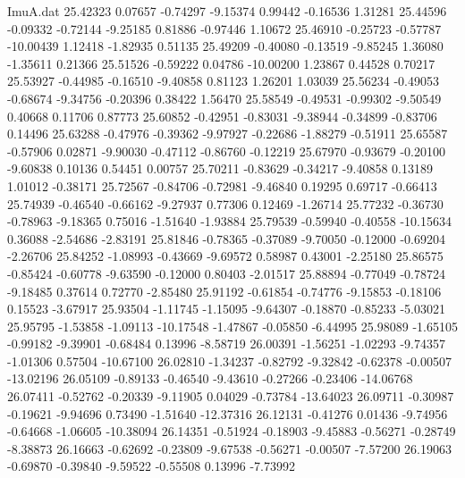 \begin{filecontents}{ImuA.dat}
  25.42323    0.07657   -0.74297   -9.15374    0.99442   -0.16536    1.31281
  25.44596   -0.09332   -0.72144   -9.25185    0.81886   -0.97446    1.10672
  25.46910   -0.25723   -0.57787  -10.00439    1.12418   -1.82935    0.51135
  25.49209   -0.40080   -0.13519   -9.85245    1.36080   -1.35611    0.21366
  25.51526   -0.59222    0.04786  -10.00200    1.23867    0.44528    0.70217
  25.53927   -0.44985   -0.16510   -9.40858    0.81123    1.26201    1.03039
  25.56234   -0.49053   -0.68674   -9.34756   -0.20396    0.38422    1.56470
  25.58549   -0.49531   -0.99302   -9.50549    0.40668    0.11706    0.87773
  25.60852   -0.42951   -0.83031   -9.38944   -0.34899   -0.83706    0.14496
  25.63288   -0.47976   -0.39362   -9.97927   -0.22686   -1.88279   -0.51911
  25.65587   -0.57906    0.02871   -9.90030   -0.47112   -0.86760   -0.12219
  25.67970   -0.93679   -0.20100   -9.60838    0.10136    0.54451    0.00757
  25.70211   -0.83629   -0.34217   -9.40858    0.13189    1.01012   -0.38171
  25.72567   -0.84706   -0.72981   -9.46840    0.19295    0.69717   -0.66413
  25.74939   -0.46540   -0.66162   -9.27937    0.77306    0.12469   -1.26714
  25.77232   -0.36730   -0.78963   -9.18365    0.75016   -1.51640   -1.93884
  25.79539   -0.59940   -0.40558  -10.15634    0.36088   -2.54686   -2.83191
  25.81846   -0.78365   -0.37089   -9.70050   -0.12000   -0.69204   -2.26706
  25.84252   -1.08993   -0.43669   -9.69572    0.58987    0.43001   -2.25180
  25.86575   -0.85424   -0.60778   -9.63590   -0.12000    0.80403   -2.01517
  25.88894   -0.77049   -0.78724   -9.18485    0.37614    0.72770   -2.85480
  25.91192   -0.61854   -0.74776   -9.15853   -0.18106    0.15523   -3.67917
  25.93504   -1.11745   -1.15095   -9.64307   -0.18870   -0.85233   -5.03021
  25.95795   -1.53858   -1.09113  -10.17548   -1.47867   -0.05850   -6.44995
  25.98089   -1.65105   -0.99182   -9.39901   -0.68484    0.13996   -8.58719
  26.00391   -1.56251   -1.02293   -9.74357   -1.01306    0.57504  -10.67100
  26.02810   -1.34237   -0.82792   -9.32842   -0.62378   -0.00507  -13.02196
  26.05109   -0.89133   -0.46540   -9.43610   -0.27266   -0.23406  -14.06768
  26.07411   -0.52762   -0.20339   -9.11905    0.04029   -0.73784  -13.64023
  26.09711   -0.30987   -0.19621   -9.94696    0.73490   -1.51640  -12.37316
  26.12131   -0.41276    0.01436   -9.74956   -0.64668   -1.06605  -10.38094
  26.14351   -0.51924   -0.18903   -9.45883   -0.56271   -0.28749   -8.38873
  26.16663   -0.62692   -0.23809   -9.67538   -0.56271   -0.00507   -7.57200
  26.19063   -0.69870   -0.39840   -9.59522   -0.55508    0.13996   -7.73992

\end{filecontents}
